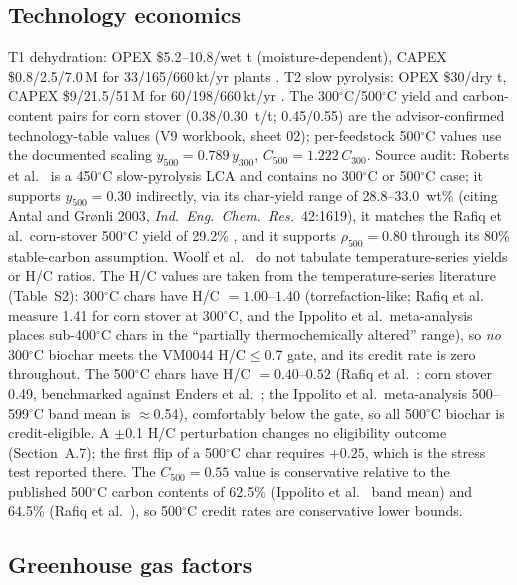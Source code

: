 \subsection{Technology economics}

T1 dehydration: OPEX \$5.2--10.8/wet t (moisture-dependent), CAPEX
\$0.8/2.5/7.0\,M for 33/165/660\,kt/yr plants \cite{yue2014,gebreegziabher2014}.
T2 slow
pyrolysis: OPEX \$30/dry t, CAPEX \$9/21.5/51\,M for 60/198/660\,kt/yr
\cite{shabangu2014,roberts2010}. The 300$^\circ$C/500$^\circ$C yield and
carbon-content pairs
for corn stover (0.38/0.30~t/t; 0.45/0.55) are the advisor-confirmed
technology-table values (V9 workbook, sheet 02); per-feedstock 500$^\circ$C
values use the documented scaling
$y_{500}=0.789\,y_{300}$, $C_{500}=1.222\,C_{300}$. Source audit: Roberts et
al.\ \cite{roberts2010} is a 450$^\circ$C slow-pyrolysis LCA and contains no
300$^\circ$C or 500$^\circ$C case; it supports $y_{500}=0.30$ indirectly, via
its char-yield range of 28.8--33.0~wt\% (citing Antal and Gr{\o}nli 2003,
\emph{Ind.\ Eng.\ Chem.\ Res.}\ 42:1619), it matches the Rafiq et al.\ corn-stover
500$^\circ$C yield of 29.2\% \cite{rafiq2016}, and it supports
$\rho_{500}=0.80$ through its 80\% stable-carbon assumption. Woolf et
al.\ \cite{woolf2010} do not tabulate temperature-series yields or H/C
ratios. The H/C values are taken from the temperature-series literature
(Table~S2): 300$^\circ$C chars have H/C $=1.00$--$1.40$ (torrefaction-like;
Rafiq et al.\ \cite{rafiq2016} measure 1.41 for corn stover at 300$^\circ$C,
and the Ippolito et al.\ meta-analysis \cite{ippolito2020} places sub-400$^\circ$C
chars in the ``partially thermochemically altered'' range), so
\emph{no} 300$^\circ$C biochar meets the VM0044 H/C$\le$0.7 gate, and its
credit rate is zero throughout. The 500$^\circ$C chars have H/C
$=0.40$--$0.52$ (Rafiq et al.\ \cite{rafiq2016}: corn stover 0.49, benchmarked
against Enders et al.\ \cite{enders2012}; the Ippolito et al.\ meta-analysis
500--599$^\circ$C band mean is $\approx$0.54), comfortably below the gate, so
all 500$^\circ$C biochar is credit-eligible. A $\pm$0.1 H/C perturbation
changes no eligibility outcome (Section~A.7); the first flip of a 500$^\circ$C
char requires $+0.25$, which is the stress test reported there. The
$C_{500}=0.55$ value is conservative relative to the published 500$^\circ$C
carbon contents of 62.5\% (Ippolito et al.\ \cite{ippolito2020} band mean)
and 64.5\% (Rafiq et al.\ \cite{rafiq2016}), so 500$^\circ$C credit rates are
conservative lower bounds.

\subsection{Greenhouse gas factors}

